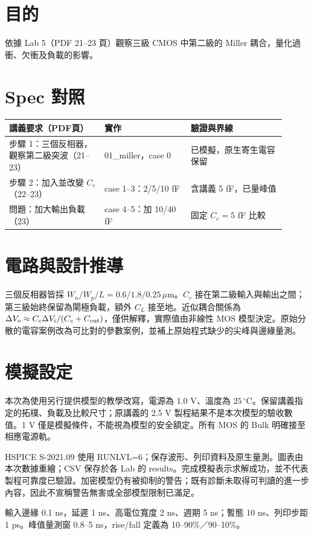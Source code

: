 \section{目的}
依據 Lab 5（PDF 21--23 頁）觀察三級 CMOS 中第二級的 Miller 耦合，量化過衝、欠衝及負載的影響。

\section{Spec 對照}
\begin{longtable}{p{0.31\linewidth}p{0.29\linewidth}p{0.31\linewidth}}
\toprule
講義要求（PDF頁） & 實作 & 驗證與界線 \\\midrule
步驟 1：三個反相器，觀察第二級突波（21--23） & 01\_miller，case 0 & 已模擬，原生寄生電容保留 \\
步驟 2：加入並改變 $C_c$（22--23） & case 1--3：2/5/10 fF & 含講義 5 fF，已量峰值 \\
問題：加大輸出負載（23） & case 4--5：加 10/40 fF & 固定 $C_c=5$ fF 比較 \\
\bottomrule
\end{longtable}


\section{電路與設計推導}
三個反相器皆採 $W_n/W_p/L=0.6/1.8/0.25\,\mu$m。$C_c$ 接在第二級輸入與輸出之間；第三級始終保留為閘極負載，額外 $C_L$ 接至地。近似耦合關係為 $\Delta V_o\approx C_c\Delta V_i/(C_c+C_{\rm out})$，僅供解釋，實際值由非線性 MOS 模型決定。原始分散的電容案例改為可比對的參數案例，並補上原始程式缺少的尖峰與邊緣量測。

\section{模擬設定}
本次為使用另行提供模型的教學改寫，電源為 1.0 V、溫度為 $25\,^{\circ}\mathrm C$。保留講義指定的拓樸、負載及比較尺寸；原講義的 2.5 V 製程結果不是本次模型的驗收數值。1 V 僅是模擬條件，不能視為模型的安全額定。所有 MOS 的 Bulk 明確接至相應電源軌。

HSPICE S-2021.09 使用 RUNLVL=6；保存波形、列印資料及原生量測。圖表由本次數據重繪；CSV 保存於各 Lab 的 results。完成模擬表示求解成功，並不代表製程可靠度已驗證。加密模型仍有被抑制的警告；既有診斷未取得可判讀的進一步內容，因此不宣稱警告無害或全部模型限制已滿足。

輸入邊緣 0.1 ns，延遲 1 ns、高電位寬度 2 ns、週期 5 ns；暫態 10 ns、列印步距 1 ps。峰值量測窗 0.8--5 ns，rise/fall 定義為 10--90\%／90--10\%。

